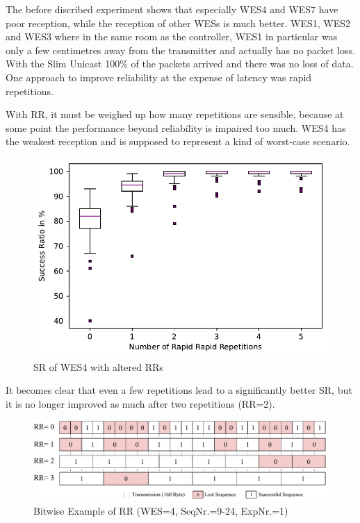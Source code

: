 The before discribed experiment shows that especially WES4 and WES7 have poor reception,
while the reception of other WESs is much better.
WES1, WES2 and WES3 where in the same room as the controller, 
WES1 in particular was only a few centimetres away from the transmitter and actually has no packet loss.
With the Slim Unicast 100\% of the packets arrived and there was no loss of data.
One approach to improve reliability at the expense of latency was rapid repetitions.

With RR, it must be weighed up how many repetitions are sensible, 
because at some point the performance beyond reliability is impaired too much.
WES4 has the weakest reception and is supposed to represent a kind of worst-case scenario.

\begin{figure}[h]
	\centering
	\includegraphics[scale=0.6]{../Plot2/Graphs/SR_of_node4_rr.pdf}
	\caption{SR of WES4 with altered RRs}
	\label{fig:sr_broadcast_wes4}
\end{figure}

It becomes clear that even a few repetitions lead to a significantly better SR,
but it is no longer improved as much after two repetitions (RR=2).

\begin{figure}[h]
	\centering
	\includegraphics[scale=0.5]{figures/rrBitwise.pdf}
	\caption{Bitwise Example of RR (WES=4, SeqNr.=9-24, ExpNr.=1)}
	\label{fig:rrBitwise}
\end{figure}


